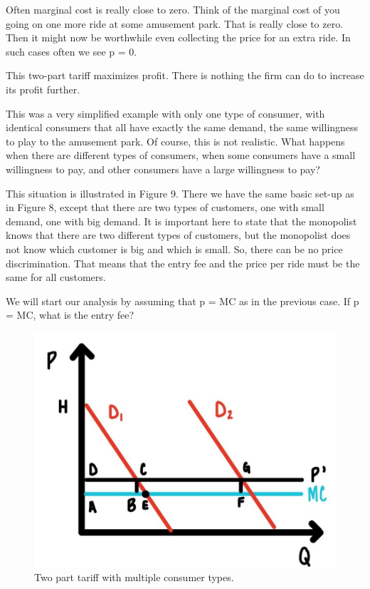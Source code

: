 \documentclass[
]{book}
\begin{document}
Often marginal cost is really close to zero. Think of the marginal cost of you going on one more ride at some amusement park. That is really close to zero. Then it might now be worthwhile even collecting the price for an extra ride. In such cases often we see p = 0.

This two-part tariff maximizes profit. There is nothing the firm can do to increase its profit further.

This was a very simplified example with only one type of consumer, with identical consumers that all have exactly the same demand, the same willingness to play to the amusement park. Of course, this is not realistic. What happens when there are different types of consumers, when some consumers have a small willingness to pay, and other consumers have a large willingness to pay?

This situation is illustrated in Figure 9. There we have the same basic set-up as in Figure 8, except that there are two types of customers, one with small demand, one with big demand. It is important here to state that the monopolist knows that there are two different types of customers, but the monopolist does not know which customer is big and which is small. So, there can be no price discrimination. That means that the entry fee and the price per ride must be the same for all customers.

We will start our analysis by assuming that p = MC as in the previous case. If p = MC, what is the entry fee?

\begin{figure}

{\centering \includegraphics[width=0.75\linewidth]{img/monopoly/fig10} 

}

\caption{Two part tariff with multiple consumer types.}\label{fig:monopoly10}
\end{figure}
\end{document}
